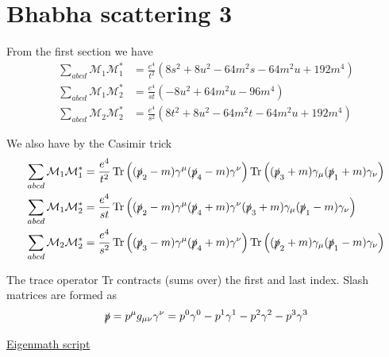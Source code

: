 

\section*{Bhabha scattering 3}

From the first section we have
\begin{align*}
\sum_{abcd}\mathcal M_1\mathcal M_1^*
&=\frac{e^4}{t^2}\left(8 s^2 + 8 u^2 - 64 m^2 s - 64 m^2 u + 192 m^4\right)
\\
\sum_{abcd}\mathcal M_1\mathcal M_2^*
&=\frac{e^4}{st}\left(-8 u^2 + 64 m^2 u - 96 m^4\right)
\\
\sum_{abcd}\mathcal M_2\mathcal M_2^*
&=\frac{e^4}{s^2}\left(8 t^2 + 8 u^2 - 64 m^2 t - 64 m^2 u + 192 m^4\right)
\end{align*}

We also have by the Casimir trick
\begin{align*}
\sum_{abcd}\mathcal M_1\mathcal M_1^*
&=\frac{e^4}{t^2}\operatorname{Tr}\left(
(\slashed p_2-m)\gamma^\mu(\slashed p_4-m)\gamma^\nu
\right)
\operatorname{Tr}\left(
(\slashed p_3+m)\gamma_\mu(\slashed p_1+m)\gamma_\nu
\right)
\\
\sum_{abcd}\mathcal M_1\mathcal M_2^*
&=\frac{e^4}{st}
\operatorname{Tr}\left(
(\slashed p_2-m)\gamma^\mu(\slashed p_4+m)\gamma^\nu
(\slashed p_3+m)\gamma_\mu(\slashed p_1-m)\gamma_\nu
\right)
\\
\sum_{abcd}\mathcal M_2\mathcal M_2^*
&=\frac{e^4}{s^2}\operatorname{Tr}\left(
(\slashed p_3-m)\gamma^\mu(\slashed p_4+m)\gamma^\nu
\right)
\operatorname{Tr}\left(
(\slashed p_2+m)\gamma_\mu(\slashed p_1-m)\gamma_\nu
\right)
\end{align*}

The trace operator Tr contracts (sums over) the first and last index.
Slash matrices are formed as
\begin{equation*}
\slashed p=p^\mu g_{\mu\nu}\gamma^\nu
=p^0\gamma^0-p^1\gamma^1-p^2\gamma^2-p^3\gamma^3
\end{equation*}

\href{https://georgeweigt.github.io/examples/bhabha-scattering-3-demo.html}{Eigenmath script}


